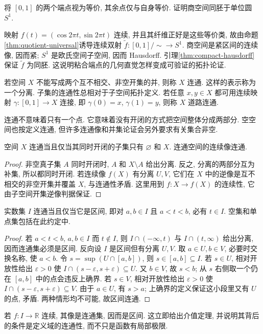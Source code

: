 \begin{example}
将 $[0,1]$ 的两个端点视为等价, 其余点仅与自身等价. 证明商空间同胚于单位圆 $S^1$.
\end{example}
\begin{solution}
映射 $f(t)=(\cos 2\pi t,\sin 2\pi t)$ 连续, 并且其纤维正好是这些等价类, 故由命题\ref{thm:quotient-universal}诱导连续双射 $\widetilde f:[0,1]/{\sim}\to S^1$. 商空间是紧区间的连续像, 因而紧; $S^1$ 是欧氏空间子空间, 因而 Hausdorff. 引理\ref{thm:compact-hausdorff}保证 $\widetilde f$ 为同胚. 这说明粘合端点的几何直觉怎样变成可验证的拓扑论证.
\end{solution}

\begin{definition}
若空间 $X$ 不能写成两个互不相交、非空开集的并, 则称 $X$ 连通. 这样的表示称为一个分离. 子集的连通性总相对于子空间拓扑定义. 若任意 $x,y\in X$ 都可用连续映射 $\gamma:[0,1]\to X$ 连接, 即 $\gamma(0)=x$, $\gamma(1)=y$, 则称 $X$ 道路连通.
\end{definition}
连通不意味着只有一个点. 它意味着没有开闭的方式把空间整体分成两部分. 空空间也按定义连通, 但许多连通像和并集论证会另外要求有关集合非空.

\begin{proposition}
空间 $X$ 连通当且仅当其同时开闭的子集只有 $\varnothing$ 和 $X$. 连通空间的连续像连通.
\end{proposition}
\begin{proof}
非空真子集 $A$ 同时开闭时, $A$ 和 $X\setminus A$ 给出分离. 反之, 分离的两部分互为补集, 所以都同时开闭. 若连续像 $f(X)$ 有分离 $U,V$, 它们在 $X$ 中的逆像是互不相交的非空开集并覆盖 $X$, 与连通性矛盾. 这里用到 $f:X\to f(X)$ 的连续性, 它由子空间开集逆像判据保证.
\end{proof}

\begin{theorem}\label{thm:interval-connected}
实数集 $I$ 连通当且仅当它是区间, 即对 $a,b\in I$ 且 $a<t<b$, 必有 $t\in I$. 空集和单点集包括在此约定中.
\end{theorem}
\begin{proof}
若 $a<t<b$, $a,b\in I$ 而 $t\notin I$, 则 $I\cap(-\infty,t)$ 与 $I\cap(t,\infty)$ 给出分离, 因而连通集必须是区间. 反向设 $I$ 是区间但有分离 $U,V$. 取 $a\in U,b\in V$, 必要时交换名称, 使 $a<b$. 令 $s=\sup(U\cap[a,b])$, 则 $s\in[a,b]\subseteq I$. 若 $s\in U$, 相对开放性给出 $\varepsilon>0$ 使 $I\cap(s-\varepsilon,s+\varepsilon)\subseteq U$. 又 $b\in V$, 故 $s<b$; 从 $s$ 右侧取一个仍在 $[a,b]$ 中的点会违反上确界. 若 $s\in V$, 相对开放性给出 $\varepsilon>0$ 使 $I\cap(s-\varepsilon,s+\varepsilon)\subseteq V$. 由于 $a\in U$, 有 $s>a$; 上确界的定义保证这小段里又有 $U$ 的点, 矛盾. 两种情形均不可能, 故区间连通.
\end{proof}
若 $f:I\to\mathbb R$ 连续, 其像是连通集, 因而是区间. 这立即给出介值定理, 并说明其背后的条件是定义域的连通性, 而不只是函数有局部极限.

